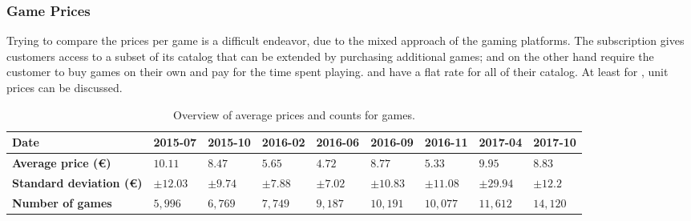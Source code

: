 \subsubsection{Game Prices}

Trying to compare the prices per game is a difficult endeavor, due to
the mixed approach of the gaming platforms. The \gfnow subscription
gives customers access to a subset of its catalog that can be
extended by purchasing additional games; \gfnowpc and \liquid
on the other hand require the customer to buy games on their
own and pay for the
time spent playing.
\psnow and \psnowpc have a flat rate for all of their catalog.
At least for \steam, unit prices can be discussed.

\begin{table}
\centering
\caption{Overview of average prices and counts for \steam games.}
\label{tab:steam-price-stats}
\begin{tabu}{X[2]|X[r]X[r]X[r]X[r]X[r]X[r]X[r]X[r]}
	\toprule
	\textbf{Date} & 2015-07 & 2015-10 & 2016-02 & 2016-06 & 2016-09 & 2016-11 & 2017-04 & 2017-10 \\
	\midrule
	\textbf{Average price (€)} & $10.11$ & $8.47$ & $5.65$ & $4.72$ & $8.77$ & $5.33$ & $9.95$ & $8.83$ \\
	\midrule
	\textbf{Standard deviation (€)} & $\pm12.03$ & $\pm9.74$ & $\pm7.88$ & $\pm7.02$ & $\pm10.83$ & $\pm11.08$ & $\pm29.94$ & $\pm12.2$ \\
	\midrule
	\textbf{Number of games} & $5,996$ & $6,769$ & $7,749$ & $9,187$ & $10,191$ & $10,077$ & $11,612$ & $14,120$ \\
	\bottomrule
\end{tabu}
\end{table}


